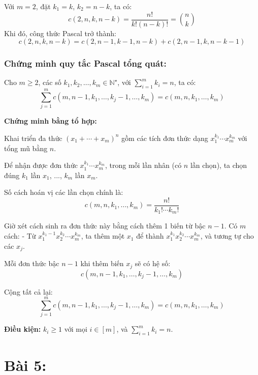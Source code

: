 \documentclass{article}
\begin{document}
	Với $m = 2$, đặt $k_1 = k$, $k_2 = n - k$, ta có:
	\[
	c(2,n,k,n - k) = \frac{n!}{k!(n - k)!} = \binom{n}{k}
	\]
	Khi đó, công thức Pascal trở thành:
	\[
	c(2,n,k,n-k) = c(2,n - 1,k - 1,n - k) + c(2,n - 1,k,n - k - 1)
	\]
	
	\subsubsection*{Chứng minh quy tắc Pascal tổng quát:}
	
	Cho $m \ge 2$, các số $k_1, k_2, \ldots, k_m \in \mathbb{N}^\star$, với $\sum_{i=1}^m k_i = n$, ta có:
	\[
	\sum_{j = 1}^m c\left(m, n - 1, k_1, \ldots, k_j - 1, \ldots, k_m\right) = c(m,n,k_1,\ldots,k_m)
	\]
	
	\textbf{Chứng minh bằng tổ hợp:}
	
	Khai triển đa thức $(x_1 + \cdots + x_m)^n$ gồm các tích đơn thức dạng $x_1^{k_1} \cdots x_m^{k_m}$ với tổng mũ bằng $n$.
	
	Để nhận được đơn thức $x_1^{k_1}\cdots x_m^{k_m}$, trong mỗi lần nhân (có $n$ lần chọn), ta chọn đúng $k_1$ lần $x_1$, ..., $k_m$ lần $x_m$.
	
	Số cách hoán vị các lần chọn chính là:
	\[
	c(m,n,k_1,\ldots,k_m) = \frac{n!}{k_1! \cdots k_m!}
	\]
	
	Giờ xét cách sinh ra đơn thức này bằng cách thêm 1 biến từ bậc $n - 1$. Có $m$ cách:
	- Từ $x_1^{k_1 - 1}x_2^{k_2} \cdots x_m^{k_m}$, ta thêm một $x_1$ để thành $x_1^{k_1}x_2^{k_2} \cdots x_m^{k_m}$, và tương tự cho các $x_j$.
	
	Mỗi đơn thức bậc $n - 1$ khi thêm biến $x_j$ sẽ có hệ số:
	\[
	c(m,n - 1, k_1,\ldots, k_j - 1, \ldots, k_m)
	\]
	
	Cộng tất cả lại:
	\[
	\boxed{
		\sum_{j=1}^{m} c\left(m, n - 1, k_1,\ldots, k_j - 1,\ldots, k_m\right) = c(m,n,k_1,\ldots,k_m)
	}
	\]
	
	\textbf{Điều kiện:} $k_i \ge 1$ với mọi $i \in [m]$, và $\sum_{i=1}^m k_i = n$.
	
	\section*{Bài 5:}
	
\end{document}
